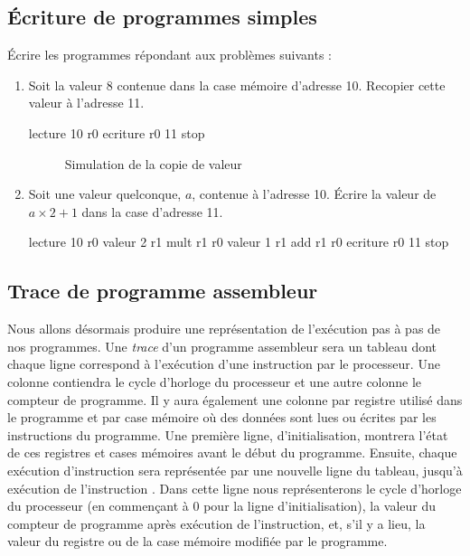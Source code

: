 \subsection{Écriture de programmes simples}
Écrire les programmes répondant aux problèmes suivants :
\begin{enumerate}
\item Soit la valeur 8 contenue dans la case mémoire d'adresse 10. Recopier cette valeur à l'adresse 11.
  \begin{correction}%
    \begin{listing}{1}
      lecture 10 r0
      ecriture r0 11
      stop
    \end{listing}

\begin{figure} %
  \centering
  
  \caption{Simulation de la copie de valeur}
  \label{trace_copie_val}
\end{figure}
  \end{correction}
\item Soit une valeur quelconque, $a$, contenue à l'adresse 10. Écrire
  la valeur de $a \times 2 + 1$ dans  la case d'adresse 11.
  \begin{correction}%
    \begin{listing}{1}
      lecture 10 r0
      valeur 2 r1
      mult r1 r0
      valeur 1 r1
      add r1 r0
      ecriture r0 11
      stop
    \end{listing}
  \end{correction}
\end{enumerate}

\subsection{Trace de programme assembleur}
Nous allons désormais produire une représentation de l'exécution pas à pas de nos programmes. Une \emph{trace} d'un programme assembleur sera un tableau dont chaque ligne correspond à l'exécution d'une instruction par le processeur.  Une colonne contiendra le cycle d'horloge du processeur et une autre colonne le compteur de programme. Il y aura également une colonne par registre utilisé dans le programme et par case mémoire où des données sont lues ou écrites par les instructions du programme. Une première ligne, d'initialisation, montrera l'état de ces registres et cases mémoires avant le début du programme. Ensuite, chaque exécution d'instruction sera représentée par une nouvelle ligne du tableau, jusqu'à exécution de l'instruction . Dans cette ligne nous représenterons le cycle d'horloge du processeur (en commençant à 0 pour la ligne d'initialisation),  la valeur du compteur de programme après exécution de l'instruction, et, s'il y a lieu, la valeur du registre ou de la case mémoire modifiée par le programme.

